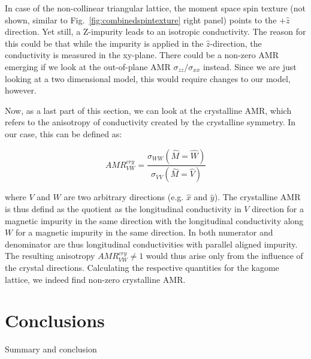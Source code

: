 \documentclass[prb,showpacs,amsmath,amssymb,superscriptaddress,twocolumn,floatfix]{revtex4-1}
\begin{document}
In case of the non-collinear triangular lattice, the moment space spin texture (not shown, similar to Fig.~\ref{fig:combinedspintexture} right panel) points to the $+\hat{z}$ direction. Yet still, a Z-impurity leads to an isotropic conductivity. The reason for this could be that while the impurity is applied in the $\hat{z}$-direction, the conductivity is measured in the xy-plane. There could be a non-zero AMR emerging if we look at the out-of-plane AMR $\sigma_{zz}/\sigma_{xx}$ instead. Since we are just looking at a two dimensional model, this would require changes to our model, however. 

Now, as a last part of this section, we can look at the crystalline AMR, which refers to the anisotropy of conductivity created by the crystalline symmetry. In our case, this can be defined as:

\begin{equation}
	AMR^{cry}_{VW} = \frac{\sigma_{WW} (\hat{M} = \hat{W})}{\sigma_{VV} (\hat{M} = \hat{V})}
\end{equation}
 
where $V$ and $W$ are two arbitrary directions (e.g. $\hat{x}$ and $\hat{y}$). The crystalline AMR is thus defind as the quotient as the longitudinal conductivity in $V$ direction for a magnetic impurity in the same direction with the longitudinal conductivity along $W$ for a magnetic impurity in the same direction. In both numerator and denominator are thus longitudinal conductivities with parallel aligned impurity. The resulting anisotropy $AMR^{cry}_{VW} \neq 1$ would thus arise only from the influence of the crystal directions. Calculating the respective quantities for the kagome lattice, we indeed find non-zero crystalline AMR.

\section{Conclusions}

Summary and conclusion
\end{document}

